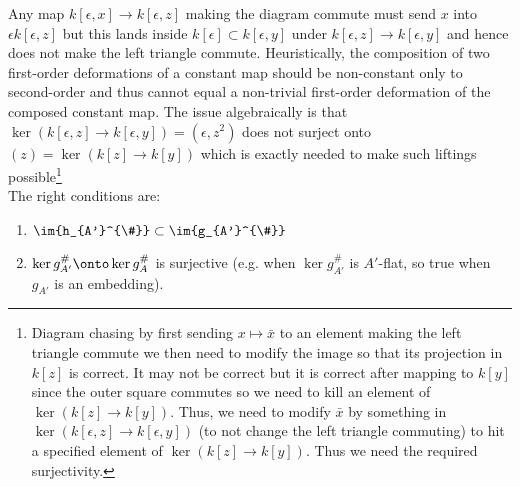 \documentclass[12pt]{article}
\begin{document}
\begin{rmk}
Any map $k[\epsilon, x] \to k[\epsilon, z]$ making the diagram commute must send $x$ into $\epsilon k[\epsilon, z]$ but this lands inside $k[\epsilon] \subset k[\epsilon, y]$ under $k[\epsilon, z] \to k[\epsilon, y]$ and hence does not make the left triangle commute. Heuristically, the composition of two first-order deformations of a constant map should be non-constant only to second-order and thus cannot equal a non-trivial first-order deformation of the composed constant map. The issue algebraically is that $\ker{(k[\epsilon, z] \to k[\epsilon, y])} = (\epsilon, z^2)$ does not surject onto $(z) = \ker{(k[z] \to k[y])}$ which is exactly needed to make such liftings possible\footnote{Diagram chasing by first sending $x \mapsto \bar{x}$ to an element making the left triangle commute we then need to modify the image so that its projection in $k[z]$ is correct. It may not be correct but it is correct after mapping to $k[y]$ since the outer square commutes so we need to kill an element of $\ker{(k[z] \to k[y])}$. Thus, we need to modify $\bar{x}$ by something in $\ker{(k[\epsilon, z] \to k[\epsilon, y])}$ (to not change the left triangle commuting) to hit a specified element of $\ker{(k[z] \to k[y])}$. Thus we need the required surjectivity.} 
\bigskip\\
The right conditions are:
\begin{enumerate}
\item $\im{h_{A'}^{\#}} \subset \im{g_{A'}^{\#}}$

\item $\ker{g_{A'}^{\#}} \onto \ker{g_{A}^{\#}}$ is surjective (e.g. when $\ker{g_{A'}^{\#}}$ is $A'$-flat, so true when $g_{A'}$ is an embedding).
\end{enumerate}


\end{rmk}
\end{document}
